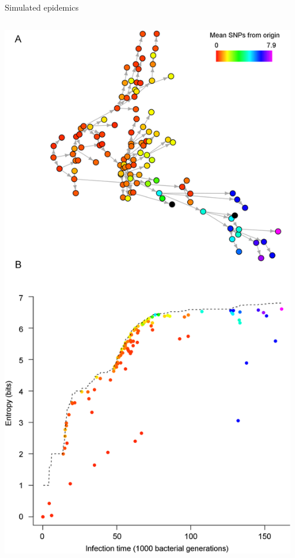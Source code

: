 \documentclass{beamer}
\begin{document}
\begin{frame}{Simulated epidemics}
    \begin{columns}
        \begin{column}{0.5\textwidth}
            \includegraphics[width=\textwidth, trim=0 1.3in 0 0, clip=true]{f4}
        \end{column}
        \begin{column}{0.5\textwidth}

\end{column}
\end{columns}
\end{frame}
\end{document}
